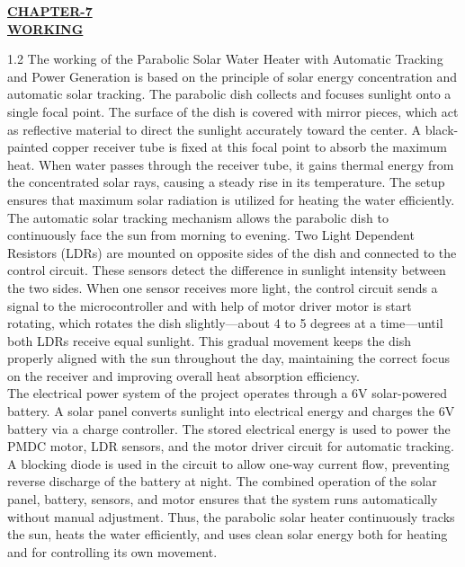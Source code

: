 \begin{center}
  {\fontsize{15}{18}\selectfont \bfseries \textcolor{red!80!black}{\underline{CHAPTER-7}}}\\[2mm]
  {\fontsize{16}{20}\selectfont \bfseries \textcolor{red!80!black}{\underline{WORKING}}}\\[5mm]
\end{center}

\noindent
\begin{spacing}{1.2}
{\fontsize{10}{14}\selectfont
The working of the Parabolic Solar Water Heater with Automatic Tracking and Power Generation is based on the principle of solar energy concentration and automatic solar tracking. The parabolic dish collects and focuses sunlight onto a single focal point. The surface of the dish is covered with mirror pieces, which act as reflective material to direct the sunlight accurately toward the center. A black-painted copper receiver tube is fixed at this focal point to absorb the maximum heat. When water passes through the receiver tube, it gains thermal energy from the concentrated solar rays, causing a steady rise in its temperature. The setup ensures that maximum solar radiation is utilized for heating the water efficiently.\\[3.5mm]
The automatic solar tracking mechanism allows the parabolic dish to continuously face the sun from morning to evening. Two Light Dependent Resistors (LDRs) are mounted on opposite sides of the dish and connected to the control circuit. These sensors detect the difference in sunlight intensity between the two sides. When one sensor receives more light, the control circuit sends a signal to the microcontroller and with help of motor driver motor is start rotating, which rotates the dish slightly---about 4 to 5 degrees at a time---until both LDRs receive equal sunlight. This gradual movement keeps the dish properly aligned with the sun throughout the day, maintaining the correct focus on the receiver and improving overall heat absorption efficiency.\\[3.5mm]
The electrical power system of the project operates through a 6V solar-powered battery. A solar panel converts sunlight into electrical energy and charges the 6V battery via a charge controller. The stored electrical energy is used to power the PMDC motor, LDR sensors, and the motor driver circuit for automatic tracking. A blocking diode is used in the circuit to allow one-way current flow, preventing reverse discharge of the battery at night. The combined operation of the solar panel, battery, sensors, and motor ensures that the system runs automatically without manual adjustment. Thus, the parabolic solar heater continuously tracks the sun, heats the water efficiently, and uses clean solar energy both for heating and for controlling its own movement.
}
\end{spacing}
\clearpage
